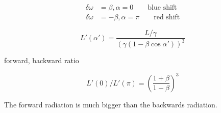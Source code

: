 \begin{align}\label{eqn:relativisticElectrodynamicsT1:240}
\delta \omega &= \beta, \alpha = 0 		\qquad \text{blue shift} \\
\delta \omega &= -\beta, \alpha = \pi 		\qquad \text{red shift}
\end{align}

\begin{equation}\label{eqn:relativisticElectrodynamicsT1:241}
L'(\alpha') = \frac{L/\gamma}{(\gamma (1 - \beta \cos\alpha'))^3}
\end{equation}

forward, backward ratio

\begin{equation}\label{eqn:relativisticElectrodynamicsT1:250}
L'(0)/L'(\pi) = {\left( \frac{ 1 + \beta }{1-\beta} \right)}^3
\end{equation}

The forward radiation is much bigger than the backwards radiation.

\EndArticle
